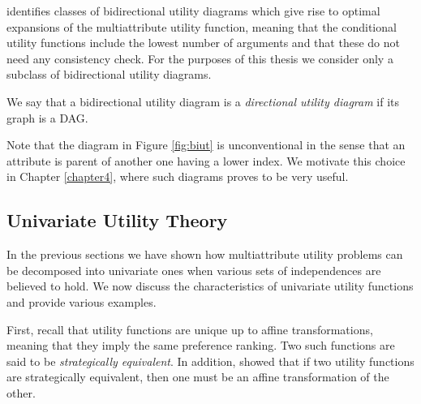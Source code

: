 \citet{Abbas2010} identifies classes of bidirectional utility diagrams which give rise to optimal expansions of the multiattribute utility function, meaning that the conditional utility functions include the lowest number of arguments and that these do not need any consistency check. For the purposes of this thesis we consider only a subclass of bidirectional utility diagrams. 
\begin{definition}
\label{def:dirutdia}
We say that a bidirectional utility diagram is a \textit{directional utility diagram} if its graph is a \gls{DAG}.
\end{definition}
Note that the diagram in Figure \ref{fig:biut} is unconventional in the sense that an attribute is parent of another one having a lower index. We  motivate this choice in Chapter \ref{chapter4}, where such diagrams proves to be very useful.
\subsection{Univariate Utility Theory}
\label{sec:univariate}
In the previous sections we have shown how multiattribute utility problems can be decomposed into univariate ones when various sets of independences are believed to hold. We now discuss the characteristics of univariate utility functions and provide various examples. 

First, recall that utility functions are unique up to affine transformations, meaning that they imply the same preference ranking. Two such functions are said to be \textit{strategically equivalent}. In addition, \citet{Keeney1993a} showed that if two utility functions are strategically equivalent, then one must be an affine transformation of the other. 

